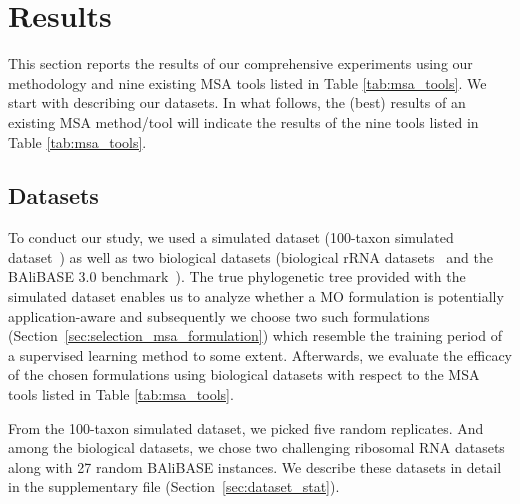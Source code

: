  \section{Results}
\label{sec:results}
This section reports the results of our comprehensive experiments using our methodology and nine existing MSA tools listed in Table \ref{tab:msa_tools}. We start with describing our datasets. In what follows, the (best) results  of an existing MSA method/tool will indicate the results of the nine tools listed in Table \ref{tab:msa_tools}.


\subsection{Datasets}
To conduct our study, we used a simulated dataset (100-taxon simulated dataset~\citep{liu2009rapid}) as well as two biological datasets (biological rRNA datasets~\citep{liu2009rapid} and the BAliBASE 3.0 benchmark~\citep{thompson2005balibase}). The true phylogenetic tree provided with the simulated dataset enables us to analyze whether a MO formulation is potentially application-aware and subsequently we choose two such formulations (Section~\ref{sec:selection_msa_formulation}) which resemble the training period of a supervised learning method to some extent. Afterwards, we evaluate the efficacy of the chosen formulations using biological datasets with respect to the MSA tools listed in Table \ref{tab:msa_tools}.  


From the 100-taxon simulated dataset, we picked five random replicates. And among the biological datasets, we chose two challenging ribosomal RNA datasets along with 27 random BAliBASE instances. We describe these datasets in detail in the supplementary file (Section~\ref{sec:dataset_stat}). 

